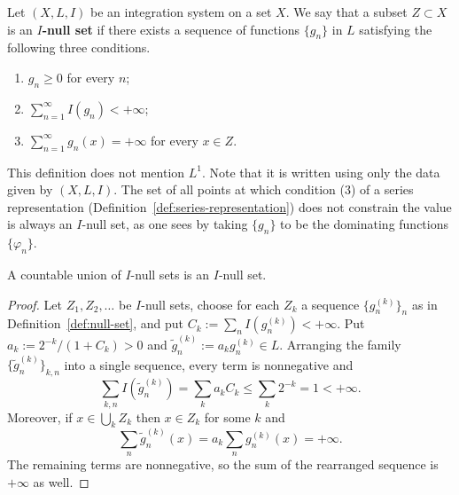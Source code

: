 \begin{definition}\label{def:null-set}
  Let $(X,L,I)$ be an integration system on a set $X$.
  We say that a subset $Z\subset X$ is an \textbf{$I$-null set} if there exists a
  sequence of functions $\{g_n\}$ in $L$ satisfying the following three
  conditions.
  \begin{enumerate}
    \item $g_n\ge0$ for every $n$;
    \item $\sum_{n=1}^{\infty}I(g_n)<+\infty$;
    \item $\sum_{n=1}^{\infty}g_n(x)=+\infty$ for every $x\in Z$.
  \end{enumerate}
\end{definition}

\noindent
This definition does not mention $L^1$.
Note that it is written using only the data given by $(X,L,I)$.
The set of all points at which condition (3) of a series representation
(Definition~\ref{def:series-representation}) does not constrain the value is
always an $I$-null set, as one sees by taking $\{g_n\}$ to be the dominating
functions $\{\varphi_n\}$.

\begin{lemma}\label{lem:null-sets-countable-union}
  A countable union of $I$-null sets is an $I$-null set.
\end{lemma}
\begin{proof}
  Let $Z_1,Z_2,\dots$ be $I$-null sets, choose for each $Z_k$ a sequence
  $\{g^{(k)}_n\}_n$ as in Definition~\ref{def:null-set}, and put
  $C_k:=\sum_nI(g^{(k)}_n)<+\infty$.
  Put $a_k:=2^{-k}/(1+C_k)>0$ and $\tilde{g}^{(k)}_n:=a_kg^{(k)}_n\in L$.
  Arranging the family $\{\tilde{g}^{(k)}_n\}_{k,n}$ into a single sequence,
  every term is nonnegative and
  \[
    \sum_{k,n}I(\tilde{g}^{(k)}_n)=\sum_ka_kC_k\le\sum_k2^{-k}=1<+\infty .
  \]
  Moreover, if $x\in\bigcup_kZ_k$ then $x\in Z_k$ for some $k$ and
  \[
    \sum_n\tilde{g}^{(k)}_n(x)=a_k\sum_ng^{(k)}_n(x)=+\infty .
  \]
  The remaining terms are nonnegative, so the sum of the rearranged sequence is
  $+\infty$ as well.
\end{proof}


